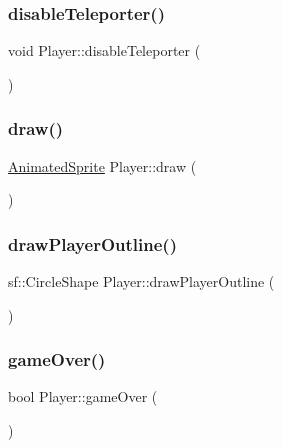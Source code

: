 \subsubsection{\texorpdfstring{disable\+Teleporter()}{disableTeleporter()}}
{\footnotesize\ttfamily void Player\+::disable\+Teleporter (\begin{DoxyParamCaption}{ }\end{DoxyParamCaption})}

\mbox{\label{class_player_af9e361fd707a32d86ff1a0f75fb2c3b2}} 
\subsubsection{\texorpdfstring{draw()}{draw()}}
{\footnotesize\ttfamily \hyperlink{class_animated_sprite}{Animated\+Sprite} Player\+::draw (\begin{DoxyParamCaption}{ }\end{DoxyParamCaption})}

\mbox{\label{class_player_ae47cf3c74c1e396d82c3266290871852}} 
\subsubsection{\texorpdfstring{draw\+Player\+Outline()}{drawPlayerOutline()}}
{\footnotesize\ttfamily sf\+::\+Circle\+Shape Player\+::draw\+Player\+Outline (\begin{DoxyParamCaption}{ }\end{DoxyParamCaption})}

\mbox{\label{class_player_a98dff5ba148838f3db6d9934048c33d9}} 
\subsubsection{\texorpdfstring{game\+Over()}{gameOver()}}
{\footnotesize\ttfamily bool Player\+::game\+Over (\begin{DoxyParamCaption}{ }\end{DoxyParamCaption})}

\mbox{\label{class_player_acd90a76e6bf73c5a7d2ff168965c3467}} 
